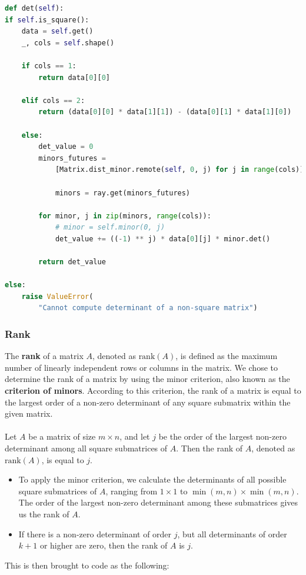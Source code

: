 \begin{lstlisting}[language=Python, caption={Parallelized determinant function}]
def det(self):
if self.is_square():
    data = self.get()
    _, cols = self.shape()

    if cols == 1:
        return data[0][0]

    elif cols == 2:
        return (data[0][0] * data[1][1]) - (data[0][1] * data[1][0])

    else:
        det_value = 0
        minors_futures = 
            [Matrix.dist_minor.remote(self, 0, j) for j in range(cols)]
        
            minors = ray.get(minors_futures)

        for minor, j in zip(minors, range(cols)):
            # minor = self.minor(0, j)
            det_value += ((-1) ** j) * data[0][j] * minor.det()

        return det_value

else:
    raise ValueError(
        "Cannot compute determinant of a non-square matrix")
\end{lstlisting}


\pagebreak
\subsubsection{Rank}
The \textbf{rank} of a matrix $A$, denoted as $\text{rank}(A)$, is defined as the maximum number of linearly independent rows or columns in the matrix. We chose to determine the rank of a matrix by using the minor criterion, also known as the \textbf{criterion of minors}. According to this criterion, the rank of a matrix is equal to the largest order of a non-zero determinant of any square submatrix within the given matrix.
\\
\\
Let $A$ be a matrix of size $m \times n$, and let $j$ be the order of the largest non-zero determinant among all square submatrices of $A$. Then the rank of $A$, denoted as $\text{rank}(A)$, is equal to $j$.

\begin{itemize}
    \item{To apply the minor criterion, we calculate the determinants of all possible square submatrices of $A$, ranging from $1 \times 1$ to $\min(m,n) \times \min(m,n)$. The order of the largest non-zero determinant among these submatrices gives us the rank of $A$.}
    \item{If there is a non-zero determinant of order $j$, but all determinants of order $k+1$ or higher are zero, then the rank of $A$ is $j$.}
\end{itemize}
This is then brought to code as the following:

